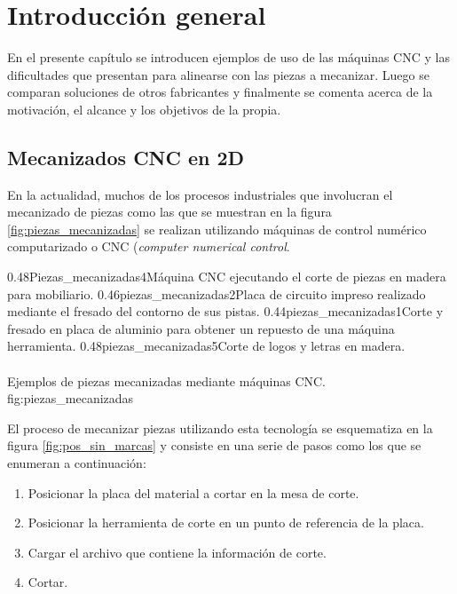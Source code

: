 \chapter{Introducción general} %

En el presente capítulo se introducen ejemplos de uso de las máquinas CNC y las dificultades que presentan para alinearse con las piezas a mecanizar. Luego se comparan soluciones de otros fabricantes y finalmente se comenta acerca de la motivación, el alcance y los objetivos de la propia.

\label{Chapter1} %
\label{IntroGeneral}

\section{Mecanizados CNC en 2D}
En la actualidad, muchos de los procesos industriales que involucran el mecanizado de piezas como las que se muestran en la figura \ref{fig:piezas_mecanizadas} se realizan utilizando máquinas de control numérico computarizado o CNC \citep{WEBSITE:cncwiki} (\textit{computer numerical control}.

\subfigtwotwo 
         {0.48}{Piezas_mecanizadas4}{Máquina CNC ejecutando el corte de piezas en madera para mobiliario.} 
         {0.46}{piezas_mecanizadas2}{Placa de circuito impreso realizado mediante el fresado del contorno de sus pistas.}
         {0.44}{piezas_mecanizadas1}{Corte y fresado en placa de aluminio para obtener un repuesto de una máquina herramienta.}
         {0.48}{piezas_mecanizadas5}{Corte de logos y letras en madera. \\ \vphantom{10}\\ \vphantom{10}}
         {Ejemplos de piezas mecanizadas mediante máquinas CNC.}
         {fig:piezas_mecanizadas}

         El proceso de mecanizar piezas utilizando esta tecnología se esquematiza en la figura \ref{fig:pos_sin_marcas} y consiste en una serie de pasos como los que se enumeran a continuación:

\begin{enumerate}
\item{Posicionar la placa del material a cortar en la mesa de corte.}
\item{Posicionar la herramienta de corte en un punto de referencia de la placa.}
\item{Cargar el archivo que contiene la información de corte.}
\item{Cortar.}
\end{enumerate}

